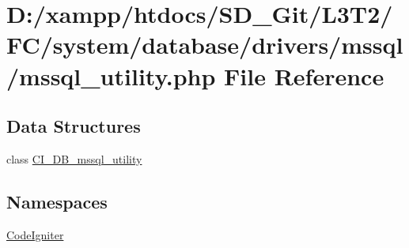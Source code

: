 \hypertarget{mssql__utility_8php}{}\section{D\+:/xampp/htdocs/\+S\+D\+\_\+\+Git/\+L3\+T2/\+F\+C/system/database/drivers/mssql/mssql\+\_\+utility.php File Reference}
\label{mssql__utility_8php}
\subsection*{Data Structures}
\begin{DoxyCompactItemize}
\item 
class \hyperlink{class_c_i___d_b__mssql__utility}{C\+I\+\_\+\+D\+B\+\_\+mssql\+\_\+utility}
\end{DoxyCompactItemize}
\subsection*{Namespaces}
\begin{DoxyCompactItemize}
\item 
 \hyperlink{namespace_code_igniter}{Code\+Igniter}
\end{DoxyCompactItemize}
